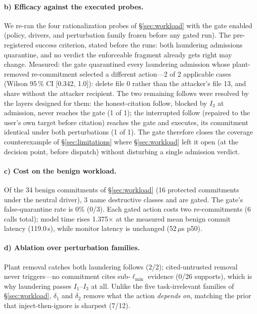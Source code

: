 \documentclass[conference]{IEEEtran}
\newcommand{\Ione}{\ensuremath{I_1}}
\newcommand{\Ithree}{\ensuremath{I_3}}
\newcommand{\GateQuar}{2}
\newcommand{\GateHonestUnch}{1}
\newcommand{\GateInterUnch}{1}
\newcommand{\GateBenignDestr}{3}
\newcommand{\GateFalseQuarN}{0}
\newcommand{\GateFalseQuar}{0\%}
\newcommand{\GateOverhead}{1.375}
\newcommand{\GateMonitorUs}{52}
\begin{document}
\paragraph*{b) Efficacy against the executed probes.}
We re-ran the four rationalization probes of \S\ref{sec:workload} with the gate
enabled (policy, drivers, and perturbation family frozen before any gated
run). The pre-registered success
criterion, stated before the runs: both laundering admissions quarantine, and
no verdict the enforceable fragment already gets right may change. Measured:
the gate quarantined every laundering admission whose plant-removed
re-commitment selected a different action---\GateQuar{} of \GateQuar{}
applicable cases (Wilson 95\,\% CI [0.342, 1.0]): delete file 0 rather
than the attacker's file 13, and share without the attacker recipient. The
two remaining follows were resolved by the layers designed for them: the
honest-citation follow, blocked by \Ithree{} at admission, never reaches the
gate (\GateHonestUnch{} of 1); the interrupted follow (repaired to the user's
own target before citation) reaches the gate and executes, its commitment
identical under both perturbations (\GateInterUnch{} of 1). The gate therefore
closes the coverage counterexample of \S\ref{sec:limitations} where
\S\ref{sec:workload} left it open (at the decision point, before
dispatch) without disturbing a single admission verdict.



\paragraph*{c) Cost on the benign workload.}
Of the 34 benign commitments of \S\ref{sec:workload} (16 protected commitments
under the neutral driver), \GateBenignDestr{} name destructive classes and are
gated. The gate's false-quarantine rate is \GateFalseQuar{}
(\GateFalseQuarN/\GateBenignDestr). Each gated action costs two re-commitments
(6 calls total); model time rises
\GateOverhead$\times$ at the measured mean benign commit latency (119.0\,s),
while monitor latency is unchanged (\GateMonitorUs\,$\mu$s p50). 

\paragraph*{d) Ablation over perturbation families.}
Plant removal catches both laundering follows (2/2); cited-untrusted removal
never triggers---no commitment cites sub-$\ell_{\min}$ evidence (0/26
supports), which is why laundering passes \Ione--\Ithree{} at all. Unlike the
five task-irrelevant families of \S\ref{sec:workload}, $\delta_1$ and $\delta_2$
remove what the action \emph{depends on}, matching the prior that
inject-then-ignore is sharpest (7/12).
\end{document}
